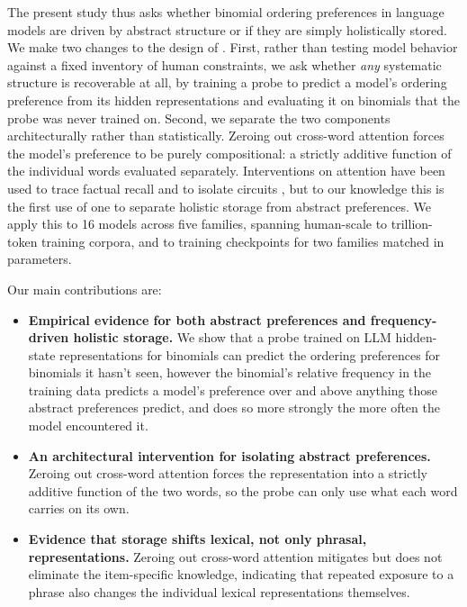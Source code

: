 \documentclass[11pt]{article}
\providecommand{\tightlist}{%
  \setlength{\itemsep}{0pt}\setlength{\parskip}{0pt}}
\begin{document}
The present study thus asks whether binomial ordering preferences in
language models are driven by abstract structure or if they are simply
holistically stored. We make two changes to the design of
\citet{houghton2025role}. First, rather than testing model behavior
against a fixed inventory of human constraints, we ask whether
\emph{any} systematic structure is recoverable at all, by training a
probe to predict a model's ordering preference from its hidden
representations and evaluating it on binomials that the probe was never
trained on. Second, we separate the two components architecturally
rather than statistically. Zeroing out cross-word attention forces the
model's preference to be purely compositional: a strictly additive
function of the individual words evaluated separately. Interventions on
attention have been used to trace factual recall and to isolate circuits
\citep{geva-etal-2023-dissecting, wang2023interpretability}, but to our
knowledge this is the first use of one to separate holistic storage from
abstract preferences. We apply this to 16 models across five families,
spanning human-scale to trillion-token training corpora, and to training
checkpoints for two families matched in parameters.

Our main contributions are:

\begin{itemize}
\tightlist
\item
  \textbf{Empirical evidence for both abstract preferences and
  frequency-driven holistic storage.} We show that a probe trained on
  LLM hidden-state representations for binomials can predict the
  ordering preferences for binomials it hasn't seen, however the
  binomial's relative frequency in the training data predicts a model's
  preference over and above anything those abstract preferences predict,
  and does so more strongly the more often the model encountered it.
\item
  \textbf{An architectural intervention for isolating abstract
  preferences.} Zeroing out cross-word attention forces the
  representation into a strictly additive function of the two words, so
  the probe can only use what each word carries on its own.
\item
  \textbf{Evidence that storage shifts lexical, not only phrasal,
  representations.} Zeroing out cross-word attention mitigates but does
  not eliminate the item-specific knowledge, indicating that repeated
  exposure to a phrase also changes the individual lexical
  representations themselves.
\end{itemize}
\end{document}
